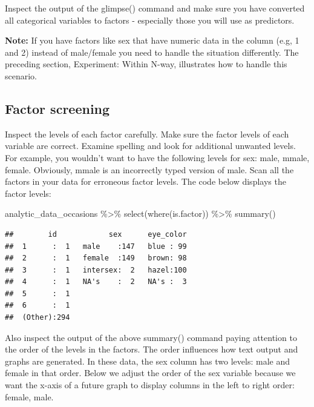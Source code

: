 \documentclass[
]{krantz}
\makeatletter
\newenvironment{Shaded}{\begin{snugshade}}{\end{snugshade}}
\newcommand{\FunctionTok}[1]{\textcolor[rgb]{0,0,0}{#1}}
\newcommand{\NormalTok}[1]{#1}
\newcommand{\SpecialCharTok}[1]{\textcolor[rgb]{0,0,0}{#1}}
\newenvironment{kframe}{%
\medskip{}
\setlength{\fboxsep}{.8em}
 \def\at@end@of@kframe{}%
 \ifinner\ifhmode%
  \def\at@end@of@kframe{\end{minipage}}%
  \begin{minipage}{\columnwidth}%
 \fi\fi%
 \def\FrameCommand##1{\hskip\@totalleftmargin \hskip-\fboxsep
 \colorbox{shadecolor}{##1}\hskip-\fboxsep
     \hskip-\linewidth \hskip-\@totalleftmargin \hskip\columnwidth}%
 \MakeFramed {\advance\hsize-\width
   \@totalleftmargin\z@ \linewidth\hsize
   \@setminipage}}%
 {\par\unskip\endMakeFramed%
 \at@end@of@kframe}
\renewenvironment{Shaded}{\begin{kframe}}{\end{kframe}}
\makeatother
\begin{document}
Inspect the output of the glimpse() command and make sure you have converted all categorical variables to factors - especially those you will use as predictors.

\textbf{Note:} If you have factors like sex that have numeric data in the column (e.g, 1 and 2) instead of male/female you need to handle the situation differently. The preceding section, Experiment: Within N-way, illustrates how to handle this scenario.

\hypertarget{factor-screening-6}{%
\subsection{Factor screening}\label{factor-screening-6}}

Inspect the levels of each factor carefully. Make sure the factor levels of each variable are correct. Examine spelling and look for additional unwanted levels. For example, you wouldn't want to have the following levels for sex: male, mmale, female. Obviously, mmale is an incorrectly typed version of male. Scan all the factors in your data for erroneous factor levels. The code below displays the factor levels:

\begin{Shaded}
\begin{Highlighting}[]
\NormalTok{analytic\_data\_occasions }\SpecialCharTok{\%\textgreater{}\%}
  \FunctionTok{select}\NormalTok{(}\FunctionTok{where}\NormalTok{(is.factor)) }\SpecialCharTok{\%\textgreater{}\%}
  \FunctionTok{summary}\NormalTok{()}
\end{Highlighting}
\end{Shaded}

\begin{verbatim}
##        id            sex      eye_color  
##  1      :  1   male    :147   blue : 99  
##  2      :  1   female  :149   brown: 98  
##  3      :  1   intersex:  2   hazel:100  
##  4      :  1   NA's    :  2   NA's :  3  
##  5      :  1                             
##  6      :  1                             
##  (Other):294
\end{verbatim}

Also inspect the output of the above summary() command paying attention to the order of the levels in the factors. The order influences how text output and graphs are generated. In these data, the sex column has two levels: male and female in that order. Below we adjust the order of the sex variable because we want the x-axis of a future graph to display columns in the left to right order: female, male.
\end{document}
